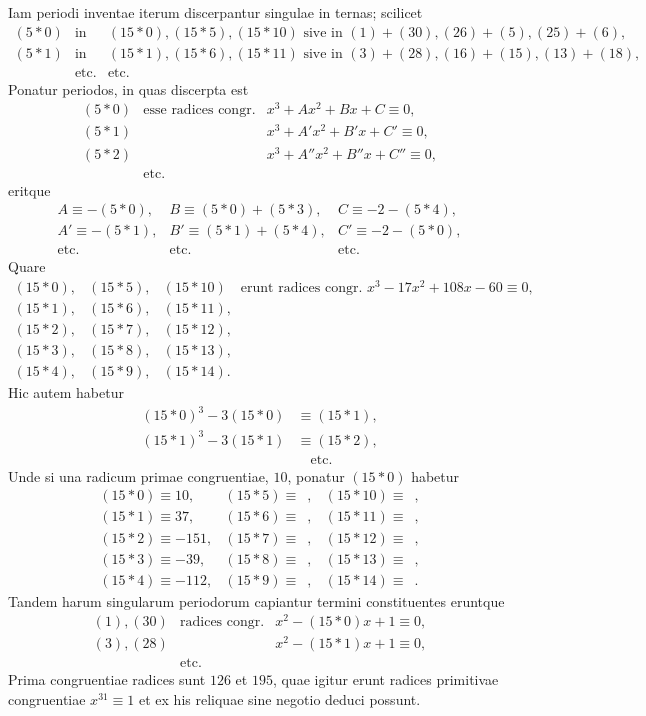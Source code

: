 \documentclass[12pt]{article}
\begin{document}
Iam periodi inventae iterum discerpantur singulae in ternas; scilicet
\[
\begin{array}{rcl}
(5*0)&\text{in}&(15*0),(15*5),(15*10)\text{ sive in }(1)+(30),(26)+(5),(25)+(6),\\
(5*1)&\text{in}&(15*1),(15*6),(15*11)\text{ sive in }(3)+(28),(16)+(15),(13)+(18),\\
&\text{etc.}&\text{etc.}
\end{array}
\]
Ponatur periodos, in quas discerpta est
\[
\begin{array}{rcl}
(5*0)&\text{esse radices congr.}&x^3+A x^2+B x+C\equiv 0,\\
(5*1)&&x^3+A'x^2+B'x+C'\equiv 0,\\
(5*2)&&x^3+A''x^2+B''x+C''\equiv 0,\\
&\text{etc.}&
\end{array}
\]
eritque
\[
\begin{array}{lll}
A\equiv -(5*0),&B\equiv (5*0)+(5*3),&C\equiv -2-(5*4),\\
A'\equiv -(5*1),&B'\equiv (5*1)+(5*4),&C'\equiv -2-(5*0),\\
\text{etc.}&\text{etc.}&\text{etc.}
\end{array}
\]
Quare
\[
\begin{array}{lll}
(15*0),&(15*5),&(15*10)\quad\text{erunt radices congr. }x^3-17x^2+108x-60\equiv 0,\\
(15*1),&(15*6),&(15*11),\\
(15*2),&(15*7),&(15*12),\\
(15*3),&(15*8),&(15*13),\\
(15*4),&(15*9),&(15*14).
\end{array}
\]
Hic autem habetur
\[
\begin{aligned}
(15*0)^3-3(15*0)&\equiv (15*1),\\
(15*1)^3-3(15*1)&\equiv (15*2),\\
&\quad\text{etc.}
\end{aligned}
\]
Unde si una radicum primae congruentiae, $10$, ponatur $(15*0)$ habetur
\[
\begin{array}{lll}
(15*0)\equiv 10,&(15*5)\equiv \phantom{0},&(15*10)\equiv \phantom{0},\\
(15*1)\equiv 37,&(15*6)\equiv \phantom{0},&(15*11)\equiv \phantom{0},\\
(15*2)\equiv -151,&(15*7)\equiv \phantom{0},&(15*12)\equiv \phantom{0},\\
(15*3)\equiv -39,&(15*8)\equiv \phantom{0},&(15*13)\equiv \phantom{0},\\
(15*4)\equiv -112,&(15*9)\equiv \phantom{0},&(15*14)\equiv \phantom{0}.
\end{array}
\]
Tandem harum singularum periodorum capiantur termini constituentes eruntque
\[
\begin{array}{rcl}
(1),(30)&\text{radices congr.}&x^2-(15*0)x+1\equiv 0,\\
(3),(28)&&x^2-(15*1)x+1\equiv 0,\\
&\text{etc.}&
\end{array}
\]
Prima congruentiae radices sunt $126$ et $195$, quae igitur erunt radices primitivae congruentiae $x^{31}\equiv 1$ et ex his reliquae sine negotio deduci possunt.
\end{document}

